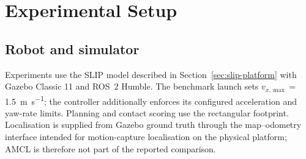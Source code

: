 \documentclass[journal]{IEEEtran}
\begin{document}
\section{Experimental Setup}
\label{sec:setup}

\subsection{Robot and simulator}
Experiments use the SLIP model described in Section~\ref{sec:slip-platform}
with Gazebo Classic 11 and ROS~2 Humble. The benchmark launch sets
$v_{x,\max}={}$\SI{1.5}{\metre\per\second}; the controller additionally enforces
its configured acceleration and yaw-rate limits. Planning and contact scoring
use the rectangular footprint. Localisation is supplied from Gazebo ground
truth through the map--odometry interface intended for motion-capture
localisation on the physical platform; AMCL is therefore not part of the
reported comparison.
\end{document}
